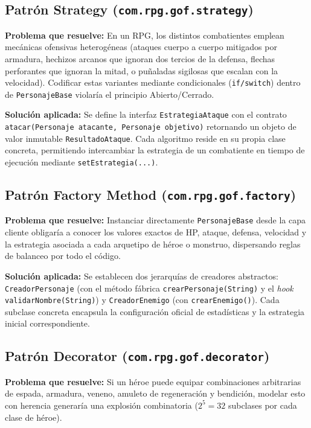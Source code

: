 \documentclass[12pt,letterpaper]{article}
\begin{document}
\subsection{Patrón Strategy (\texttt{com.rpg.gof.strategy})}
\textbf{Problema que resuelve:} En un RPG, los distintos combatientes emplean mecánicas ofensivas heterogéneas (ataques cuerpo a cuerpo mitigados por armadura, hechizos arcanos que ignoran dos tercios de la defensa, flechas perforantes que ignoran la mitad, o puñaladas sigilosas que escalan con la velocidad). Codificar estas variantes mediante condicionales (\texttt{if/switch}) dentro de \texttt{PersonajeBase} violaría el principio Abierto/Cerrado.

\textbf{Solución aplicada:} Se define la interfaz \texttt{EstrategiaAtaque} con el contrato \texttt{atacar(Personaje atacante, Personaje objetivo)} retornando un objeto de valor inmutable \texttt{ResultadoAtaque}. Cada algoritmo reside en su propia clase concreta, permitiendo intercambiar la estrategia de un combatiente en tiempo de ejecución mediante \texttt{setEstrategia(...)}.

\subsection{Patrón Factory Method (\texttt{com.rpg.gof.factory})}
\textbf{Problema que resuelve:} Instanciar directamente \texttt{PersonajeBase} desde la capa cliente obligaría a conocer los valores exactos de HP, ataque, defensa, velocidad y la estrategia asociada a cada arquetipo de héroe o monstruo, dispersando reglas de balanceo por todo el código.

\textbf{Solución aplicada:} Se establecen dos jerarquías de creadores abstractos: \texttt{CreadorPersonaje} (con el método fábrica \texttt{crearPersonaje(String)} y el \textit{hook} \texttt{validarNombre(String)}) y \texttt{CreadorEnemigo} (con \texttt{crearEnemigo()}). Cada subclase concreta encapsula la configuración oficial de estadísticas y la estrategia inicial correspondiente.

\subsection{Patrón Decorator (\texttt{com.rpg.gof.decorator})}
\textbf{Problema que resuelve:} Si un héroe puede equipar combinaciones arbitrarias de espada, armadura, veneno, amuleto de regeneración y bendición, modelar esto con herencia generaría una explosión combinatoria ($2^5 = 32$ subclases por cada clase de héroe).
\end{document}
